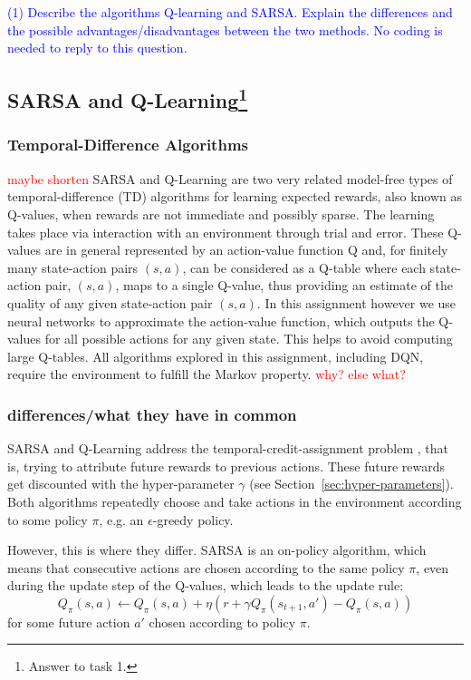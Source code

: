 \documentclass[conference]{IEEEtran}
\begin{document}
\textcolor{blue}{(1) Describe the algorithms Q-learning and SARSA. Explain the differences and the possible advantages/disadvantages between the two methods. No coding is needed to reply to this question.}


\subsection{SARSA and Q-Learning\footnote{Answer to task 1.}}


\subsubsection{Temporal-Difference Algorithms}
\textcolor{red}{maybe shorten}
SARSA and Q-Learning are two very related model-free types of temporal-difference (TD) algorithms for learning expected rewards, also known as Q-values, when rewards are not immediate and possibly sparse. The learning takes place via interaction with an environment through trial and error. These Q-values are in general represented by an action-value function Q and, for finitely many state-action pairs $(s,a)$, can be considered as a Q-table where each state-action pair, $(s,a)$, maps to a single Q-value, thus providing an estimate of the quality of any given state-action pair $(s,a)$. In this assignment however we use neural networks to approximate the action-value function, which outputs the Q-values for all possible actions for any given state. This helps to avoid computing large Q-tables. All algorithms explored in this assignment, including DQN, require the environment to fulfill the Markov property. \textcolor{red}{why? else what?}

\subsubsection{differences/what they have in common}
SARSA and Q-Learning address the temporal-credit-assignment problem \cite{sutton1984}, that is, trying to attribute future rewards to previous actions. These future rewards get discounted with the hyper-parameter $\gamma$ (see Section~\ref{sec:hyper-parameters}). Both algorithms repeatedly choose and take actions in the environment according to some policy $\pi$, e.g. an $\epsilon$-greedy policy.

However, this is where they differ.
SARSA is an on-policy algorithm, which means that consecutive actions are chosen according to the same policy $\pi$, even during the update step of the Q-values, which leads to the update rule: $$Q_\pi(s,a) \leftarrow Q_\pi(s,a) + \eta(r + \gamma Q_\pi(s_{t+1},a') - Q_\pi(s,a))$$ for some future action $a'$ chosen according to policy $\pi$.
\end{document}
